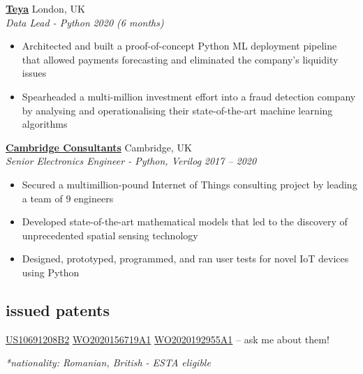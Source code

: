 \documentclass[12pt]{article}
\newcommand{\entry}[4]{{{\textbf{#1}}} \hfill #3 \\ #2 \hfill #4}
\begin{document}
    \smallskip
    \entry{\href{https://teya.com}{Teya}}{\textit{Data Lead - Python}}{London, UK}{\textit{2020 (6 months)}}
    \begin{itemize}[noitemsep,leftmargin=6mm,rightmargin=0mm,topsep=0pt]
        \item Architected and built a proof-of-concept Python ML deployment pipeline that allowed payments forecasting and eliminated the company’s liquidity issues
        \item Spearheaded a multi-million investment effort into a fraud detection company by analysing and operationalising their state-of-the-art machine learning algorithms
    \end{itemize}

    \smallskip
    \entry{\href{https://www.cambridgeconsultants.com/home}{Cambridge Consultants}}{\textit{Senior Electronics Engineer - Python, Verilog}}{Cambridge, UK}{\textit{2017 -- 2020}}
    \begin{itemize}[noitemsep,leftmargin=6mm,rightmargin=0mm,topsep=0pt]
        \item Secured a multimillion-pound Internet of Things consulting project by leading a team of 9 engineers
        \item Developed state-of-the-art mathematical models that led to the discovery of unprecedented spatial sensing technology
        \item Designed, prototyped, programmed, and ran user tests for novel IoT devices using Python
    \end{itemize}

    \bigskip

    \begin{paracol}{2}
        \section{issued patents}
        \switchcolumn
        \bigskip
        \medskip
        \href{https://patents.google.com/patent/US10691208B2/en?inventor=silviu+toma}{US10691208B2}
        \textperiodcentered{}
        \href{https://patents.google.com/patent/WO2020156719A1/en?inventor=silviu+toma}{WO2020156719A1}
        \textperiodcentered{}
        \href{https://patents.google.com/patent/WO2020192955A1/en?inventor=silviu+toma}{WO2020192955A1}
        -- ask me about them!

    \end{paracol}


    \vfill %
    \raggedright %
    \footnotesize \textit{*nationality: Romanian, British - ESTA eligible}%
\end{document}
